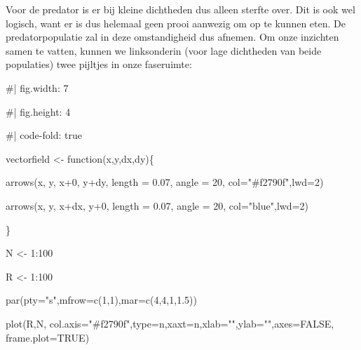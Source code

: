\documentclass[
  a4paper,
]{scrbook}
\newenvironment{Shaded}{\begin{snugshade}}{\end{snugshade}}
\newcommand{\AttributeTok}[1]{\textcolor[rgb]{0.40,0.45,0.13}{#1}}
\newcommand{\CommentTok}[1]{\textcolor[rgb]{0.37,0.37,0.37}{#1}}
\newcommand{\ConstantTok}[1]{\textcolor[rgb]{0.56,0.35,0.01}{#1}}
\newcommand{\ControlFlowTok}[1]{\textcolor[rgb]{0.00,0.23,0.31}{#1}}
\newcommand{\DecValTok}[1]{\textcolor[rgb]{0.68,0.00,0.00}{#1}}
\newcommand{\FloatTok}[1]{\textcolor[rgb]{0.68,0.00,0.00}{#1}}
\newcommand{\FunctionTok}[1]{\textcolor[rgb]{0.28,0.35,0.67}{#1}}
\newcommand{\NormalTok}[1]{\textcolor[rgb]{0.00,0.23,0.31}{#1}}
\newcommand{\OtherTok}[1]{\textcolor[rgb]{0.00,0.23,0.31}{#1}}
\newcommand{\SpecialCharTok}[1]{\textcolor[rgb]{0.37,0.37,0.37}{#1}}
\newcommand{\StringTok}[1]{\textcolor[rgb]{0.13,0.47,0.30}{#1}}
\theoremstyle{definition}
\theoremstyle{remark}
\begin{document}
Voor de predator is er bij kleine dichtheden dus alleen sterfte over.
Dit is ook wel logisch, want er is dus helemaal geen prooi aanwezig om
op te kunnen eten. De predatorpopulatie zal in deze omstandigheid dus
afnemen. Om onze inzichten samen te vatten, kunnen we linksonderin (voor
lage dichtheden van beide populaties) twee pijltjes in onze faseruimte:

\begin{Shaded}
\begin{Highlighting}[]
\CommentTok{\#| fig.width: 7}

\CommentTok{\#| fig.height: 4}

\CommentTok{\#| code{-}fold: true}

\NormalTok{vectorfield }\OtherTok{\textless{}{-}} \ControlFlowTok{function}\NormalTok{(x,y,dx,dy)\{}

  \FunctionTok{arrows}\NormalTok{(x, y, x}\SpecialCharTok{+}\DecValTok{0}\NormalTok{, y}\SpecialCharTok{+}\NormalTok{dy, }\AttributeTok{length =} \FloatTok{0.07}\NormalTok{, }\AttributeTok{angle =} \DecValTok{20}\NormalTok{, }\AttributeTok{col=}\StringTok{"\#f2790f"}\NormalTok{,}\AttributeTok{lwd=}\DecValTok{2}\NormalTok{)}

  \FunctionTok{arrows}\NormalTok{(x, y, x}\SpecialCharTok{+}\NormalTok{dx, y}\SpecialCharTok{+}\DecValTok{0}\NormalTok{, }\AttributeTok{length =} \FloatTok{0.07}\NormalTok{, }\AttributeTok{angle =} \DecValTok{20}\NormalTok{, }\AttributeTok{col=}\StringTok{"blue"}\NormalTok{,}\AttributeTok{lwd=}\DecValTok{2}\NormalTok{)}

\NormalTok{\}}

\NormalTok{N }\OtherTok{\textless{}{-}} \DecValTok{1}\SpecialCharTok{:}\DecValTok{100}

\NormalTok{R }\OtherTok{\textless{}{-}} \DecValTok{1}\SpecialCharTok{:}\DecValTok{100}

\FunctionTok{par}\NormalTok{(}\AttributeTok{pty=}\StringTok{"s"}\NormalTok{,}\AttributeTok{mfrow=}\FunctionTok{c}\NormalTok{(}\DecValTok{1}\NormalTok{,}\DecValTok{1}\NormalTok{),}\AttributeTok{mar=}\FunctionTok{c}\NormalTok{(}\DecValTok{4}\NormalTok{,}\DecValTok{4}\NormalTok{,}\DecValTok{1}\NormalTok{,}\FloatTok{1.5}\NormalTok{))}

\FunctionTok{plot}\NormalTok{(R,N,  }\AttributeTok{col.axis=}\StringTok{"\#f2790f"}\NormalTok{,}\AttributeTok{type=}\StringTok{\textquotesingle{}n\textquotesingle{}}\NormalTok{,}\AttributeTok{xaxt=}\StringTok{\textquotesingle{}n\textquotesingle{}}\NormalTok{,}\AttributeTok{xlab=}\StringTok{""}\NormalTok{,}\AttributeTok{ylab=}\StringTok{""}\NormalTok{,}\AttributeTok{axes=}\ConstantTok{FALSE}\NormalTok{, }\AttributeTok{frame.plot=}\ConstantTok{TRUE}\NormalTok{)}


\end{Highlighting}
\end{Shaded}
\end{document}
